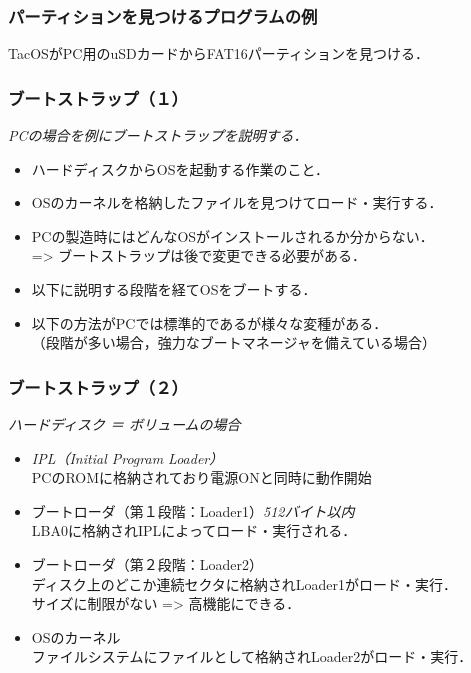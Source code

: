 \documentclass{beamer}                   %
\begin{document}
\begin{frame}
  \frametitle{パーティションを見つけるプログラムの例}
  TacOSがPC用のuSDカードからFAT16パーティションを見つける．
\end{frame}

\begin{frame}
  \frametitle{ブートストラップ（１）}
  \emph{PCの場合を例にブートストラップを説明する．}
  \begin{itemize}
  \item ハードディスクからOSを起動する作業のこと．
  \item OSのカーネルを格納したファイルを見つけてロード・実行する．
  \item PCの製造時にはどんなOSがインストールされるか分からない． \\
    => ブートストラップは後で変更できる必要がある．
  \item 以下に説明する段階を経てOSをブートする．
  \item 以下の方法がPCでは標準的であるが様々な変種がある．\\
    （段階が多い場合，強力なブートマネージャを備えている場合）
  \end{itemize}
\end{frame}

\begin{frame}
  \frametitle{ブートストラップ（２）}
  \emph{ハードディスク ＝ ボリュームの場合}
  \begin{itemize}
  \item \emph{IPL（Initial Program Loader）} \\
    \small{PCのROMに格納されており電源ONと同時に動作開始}
  \item ブートローダ（第１段階：Loader1）\emph{512バイト以内} \\
    \small{LBA0に格納されIPLによってロード・実行される．}
  \item ブートローダ（第２段階：Loader2） \\
    \small{ディスク上のどこか連続セクタに格納されLoader1がロード・実行．\\
      サイズに制限がない => 高機能にできる．}
  \item OSのカーネル \\
    \small{ファイルシステムにファイルとして格納されLoader2がロード・実行．}
  \end{itemize}
\end{frame}
\end{document}
